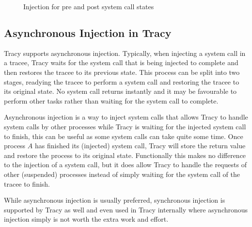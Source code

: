\documentclass[a4paper, 10pt]{report}
\begin{document}
\begin{figure}
    \centering
    \hspace{1em}
    \caption{Injection for pre and post system call states}
    \label{fig:injection}
\end{figure}

% 
% 
% 

\subsection{Asynchronous Injection in Tracy}

Tracy supports asynchronous injection. Typically, when injecting a system call
in a tracee, Tracy waits for the system call that is being injected to complete
and then restores the tracee to its previous state. This process can be split
into two stages, readying the tracee to perform a system call and restoring
the tracee to its original state. No system call returns instantly and it
may be favourable to perform other tasks rather than waiting for the system
call to complete.

Asynchronous injection is a way to inject system calls that allows Tracy to
handle system calls by other processes while Tracy is waiting for the
injected system call to finish, this can be useful as some system calls can take quite
some time.
Once process $A$ has finished its (injected) system call, Tracy will store
the return value and restore the process to its original state.
Functionally this makes no difference to the injection of a system call, but
it does allow Tracy to handle the requests of other (suspended) processes
instead of simply waiting for the system call of the tracee to finish.

While asynchronous injection is usually preferred, synchronous injection is
supported by Tracy as well and even used in Tracy internally where
asynchronous injection simply is not worth the extra work and effort.
\end{document}
